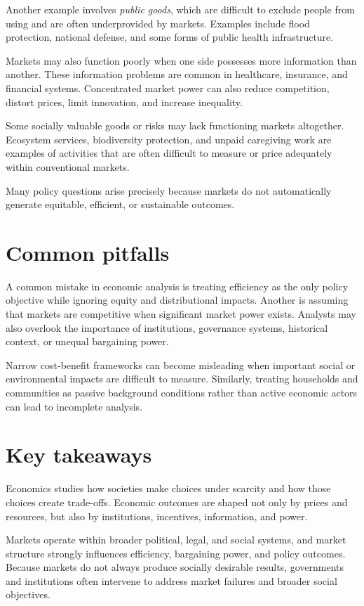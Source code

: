 \documentclass[
  11pt,
  oneside]{book}
\begin{document}
Another example involves \emph{public goods}, which are difficult to exclude people from using and are often underprovided by markets. Examples include flood protection, national defense, and some forms of public health infrastructure.

Markets may also function poorly when one side possesses more information than another. These information problems are common in healthcare, insurance, and financial systems. Concentrated market power can also reduce competition, distort prices, limit innovation, and increase inequality.

Some socially valuable goods or risks may lack functioning markets altogether. Ecosystem services, biodiversity protection, and unpaid caregiving work are examples of activities that are often difficult to measure or price adequately within conventional markets.

Many policy questions arise precisely because markets do not automatically generate equitable, efficient, or sustainable outcomes.

\section{Common pitfalls}\label{common-pitfalls}

A common mistake in economic analysis is treating efficiency as the only policy objective while ignoring equity and distributional impacts. Another is assuming that markets are competitive when significant market power exists. Analysts may also overlook the importance of institutions, governance systems, historical context, or unequal bargaining power.

Narrow cost-benefit frameworks can become misleading when important social or environmental impacts are difficult to measure. Similarly, treating households and communities as passive background conditions rather than active economic actors can lead to incomplete analysis.

\section{Key takeaways}\label{key-takeaways}

Economics studies how societies make choices under scarcity and how those choices create trade-offs. Economic outcomes are shaped not only by prices and resources, but also by institutions, incentives, information, and power.

Markets operate within broader political, legal, and social systems, and market structure strongly influences efficiency, bargaining power, and policy outcomes. Because markets do not always produce socially desirable results, governments and institutions often intervene to address market failures and broader social objectives.
\end{document}
